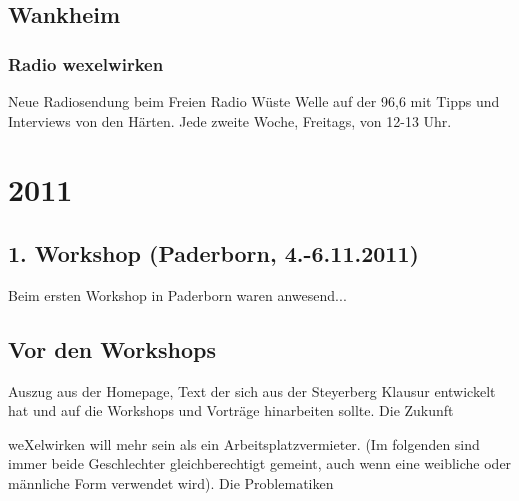 \begin{appendix}
    \subsection{Wankheim}
      \subsubsection{Radio wexelwirken}
Neue Radiosendung beim Freien Radio Wüste Welle auf der 96,6 mit Tipps und Interviews von den Härten. Jede zweite Woche, Freitags, von 12-13 Uhr.
  \section{2011}
    \subsection{1. Workshop (Paderborn, 4.-6.11.2011)}
Beim ersten Workshop in Paderborn waren anwesend...
    \subsection{Vor den Workshops}
Auszug aus der Homepage, Text der sich aus der Steyerberg Klausur entwickelt hat und auf die Workshops und Vorträge hinarbeiten sollte.
\glqq 
Die Zukunft

weXelwirken will mehr sein als ein Arbeitsplatzvermieter. (Im folgenden sind immer beide Geschlechter gleichberechtigt gemeint, auch wenn eine weibliche oder männliche Form verwendet wird).
Die Problematiken


\end{appendix}
